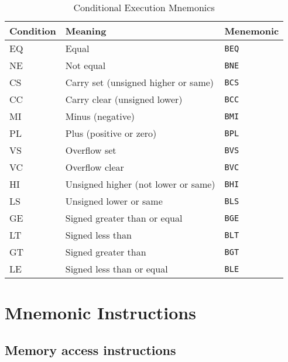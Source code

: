 \documentclass[a4paper,12pt,openany]{book}
\begin{document}
\begin{table}[H]
    \centering
    \begin{tabular}{@{}lll@{}}
        \toprule
        Condition & Meaning & Menemonic \\
        \midrule
        EQ & Equal & \texttt{BEQ} \\
        NE & Not equal & \texttt{BNE} \\
        CS & Carry set (unsigned higher or same) & \texttt{BCS} \\
        CC & Carry clear (unsigned lower) & \texttt{BCC} \\
        MI & Minus (negative) & \texttt{BMI} \\
        PL & Plus (positive or zero) & \texttt{BPL} \\
        VS & Overflow set & \texttt{BVS} \\
        VC & Overflow clear & \texttt{BVC} \\
        HI & Unsigned higher (not lower or same) & \texttt{BHI} \\
        LS & Unsigned lower or same & \texttt{BLS} \\
        GE & Signed greater than or equal & \texttt{BGE} \\
        LT & Signed less than & \texttt{BLT} \\
        GT & Signed greater than & \texttt{BGT} \\
        LE & Signed less than or equal & \texttt{BLE} \\
        \bottomrule
    \end{tabular}
    \caption{Conditional Execution Mnemonics}
    \label{tab:conditional_execution}
\end{table}
\section{Mnemonic Instructions}
\subsection{Memory access instructions}
\end{document}
